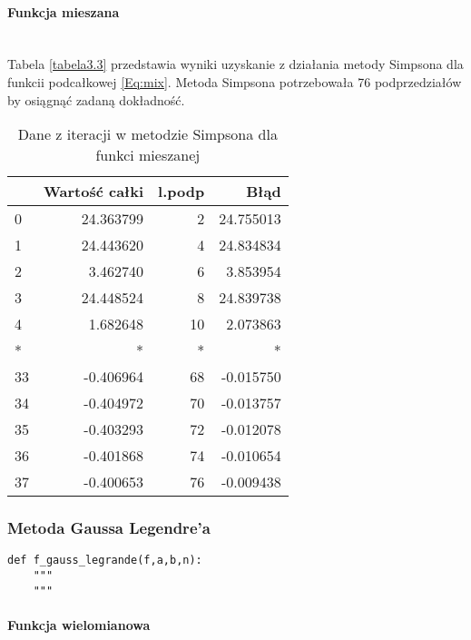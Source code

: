 \documentclass[12pt,twoside]{article}
\begin{document}
\paragraph{Funkcja mieszana}\mbox{} \\

Tabela \eqref{tabela3.3} przedstawia wyniki uzyskanie z działania metody Simpsona dla funkcii podcałkowej \eqref{Eq:mix}. Metoda Simpsona potrzebowała 76 podprzedziałów by osiągnąć zadaną dokładność.

\begin{table}[H]
\centering
\caption{Dane z iteracji w metodzie Simpsona dla funkci mieszanej}
\label{tabela3.3}
\begin{tabular}{lrrr}
\toprule
{} &  Wartość całki &  l.podp &       Błąd \\
\midrule
0  &      24.363799 &       2 &  24.755013 \\
1  &      24.443620 &       4 &  24.834834 \\
2  &       3.462740 &       6 &   3.853954 \\
3  &      24.448524 &       8 &  24.839738 \\
4  &       1.682648 &      10 &   2.073863 \\
*   &       * &       * &   * \\
33 &      -0.406964 &      68 &  -0.015750 \\
34 &      -0.404972 &      70 &  -0.013757 \\
35 &      -0.403293 &      72 &  -0.012078 \\
36 &      -0.401868 &      74 &  -0.010654 \\
37 &      -0.400653 &      76 &  -0.009438 \\
\bottomrule
\end{tabular}

\end{table}


\subsubsection{Metoda Gaussa Legendre'a}

\begin{lstlisting}[caption={Kod w języku python implementujący metodę trapezów}]
def f_gauss_legrande(f,a,b,n):
    """
    """
\end{lstlisting}
\label{Listing 9}

\paragraph{Funkcja wielomianowa}\mbox{} \\
\end{document}
